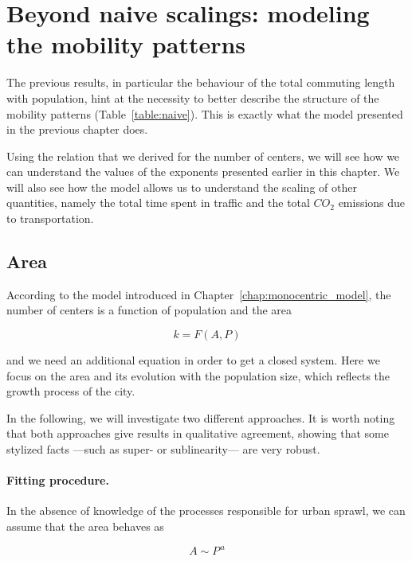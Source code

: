 \section{Beyond naive scalings: modeling the mobility patterns}

The previous results, in particular the behaviour of the total commuting length
with population, hint at the necessity to better describe the structure of the
mobility patterns (Table~\ref{table:naive}). This is exactly what the model presented in the previous
chapter does. 

Using the relation that we derived for the number of centers, we will see
how we can understand the values of the exponents presented earlier in this
chapter. We will also see how the model allows us to understand the scaling of
other quantities, namely the total time spent in traffic and the total $CO_2$
emissions due to transportation.

\subsection{Area}

According to the model introduced in Chapter~\ref{chap:monocentric_model}, the number of centers is a function of population and the area

\begin{equation}
    k = F\left(A,P\right)
\end{equation}

and we need an additional equation in order to get a closed system. Here we
focus on the area and its evolution with the population size, which reflects the
growth process of the city. 

In the following, we will investigate two different
approaches. It is worth noting that both approaches give results in qualitative
agreement, showing that some stylized facts ---such as super- or sublinearity---
are very robust.\\ 

\paragraph{Fitting procedure.}

In the absence of knowledge of the processes responsible for urban sprawl, we
can assume that the area behaves as 

\begin{equation}
    A \sim P^{\,a}
    \label{eq:fit}
\end{equation}

